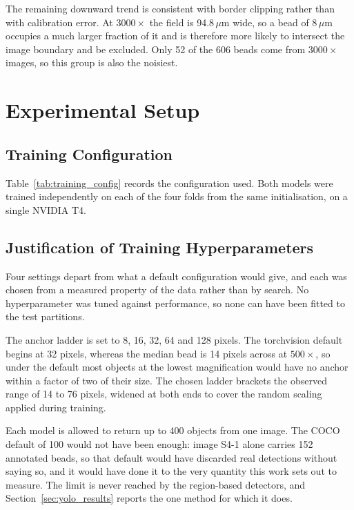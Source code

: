 The remaining downward trend is consistent with border clipping rather than with
calibration error. At $3000\times$ the field is 94.8\,$\mu$m wide, so a bead of
8\,$\mu$m occupies a much larger fraction of it and is therefore more likely
to intersect the image boundary and be excluded. Only 52 of the 606 beads come
from $3000\times$ images, so this group is also the noisiest.

\section{Experimental Setup}

\subsection{Training Configuration}

Table~\ref{tab:training_config} records the configuration used. Both models were
trained independently on each of the four folds from the same initialisation, on a
single NVIDIA T4.



\subsection{Justification of Training Hyperparameters}
\label{sec:training_config}

Four settings depart from what a default configuration would give, and each was
chosen from a measured property of the data rather than by search. No
hyperparameter was tuned against performance, so none can have been fitted to the
test partitions.

The anchor ladder is set to 8, 16, 32, 64 and 128 pixels. The torchvision
default begins at 32 pixels, whereas the median bead is 14 pixels across at $500\times$,
so under the default most objects at the lowest magnification would have no anchor
within a factor of two of their size. The chosen ladder brackets the observed
range of 14 to 76 pixels, widened at both ends to cover the random scaling applied
during training.

Each model is allowed to return up to 400 objects from one image. The COCO
default of 100 would not have been enough: image S4-1 alone carries 152 annotated
beads, so that default would have discarded real detections without saying so, and
it would have done it to the very quantity this work sets out to measure. The
limit is never reached by the region-based detectors, and Section~\ref{sec:yolo_results} reports the one
method for which it does.

